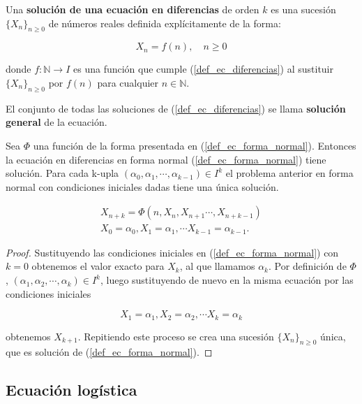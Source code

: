 \begin{definition}
Una \textbf{solución de una ecuación en diferencias} de orden $k$ es una sucesión $\{X_n\}_{n\geq 0}$ de números reales definida explícitamente de la forma:

$$X_n = f(n),\quad n\geq 0$$

donde $f: \mathbb{N} \rightarrow I$ es una función que cumple (\ref{def_ec_diferencias}) al sustituir $\{X_n\}_{n\geq 0}$ por $f(n)$ para cualquier $n\in\mathbb{N}$.

El conjunto de todas las soluciones de (\ref{def_ec_diferencias}) se llama \textbf{solución general} de la ecuación.
\end{definition}

\begin{theorem}
Sea $\Phi$ una función de la forma presentada en (\ref{def_ec_forma_normal}). Entonces la ecuación en diferencias en forma normal (\ref{def_ec_forma_normal}) tiene solución.
Para cada k-upla $(\alpha_0, \alpha_1, \cdots ,\alpha_{k-1})\in I^{k}$ el problema anterior en forma normal con condiciones iniciales dadas tiene una única solución.

\begin{equation}
\begin{aligned}
X_{n+k} = \Phi (n, X_n, X_{n+1}\cdots , X_{n+k-1}) \\
X_0 = \alpha_0, X_1=\alpha_1, \cdots X_{k-1}=\alpha_{k-1}.
\end {aligned}
\end{equation}

\end{theorem}
\begin{proof}
Sustituyendo las condiciones iniciales en (\ref{def_ec_forma_normal}) con $k=0$ obtenemos el valor exacto para $X_k$, al que llamamos $\alpha_k$. Por definición de $\Phi$, $(\alpha_1, \alpha_2, \cdots ,\alpha_{k})\in I^{k}$, luego sustituyendo de nuevo en la misma ecuación por las condiciones iniciales

$$X_1 = \alpha_1, X_2=\alpha_2, \cdots X_{k}=\alpha_{k}$$

obtenemos $X_{k+1}$. Repitiendo este proceso se crea una sucesión $\{X_n\}_{n\geq 0}$ única, que es solución de (\ref{def_ec_forma_normal}).
\end{proof}


\subsection{Ecuación logística}

